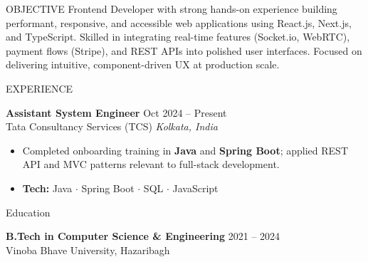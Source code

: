 \documentclass{resume}
\begin{document}
\begin{rSection}{OBJECTIVE}
Frontend Developer with strong hands-on experience building performant,
responsive, and accessible web applications using React.js, Next.js,
and TypeScript. Skilled in integrating real-time features (Socket.io, WebRTC),
payment flows (Stripe), and REST APIs into polished user interfaces.
Focused on delivering intuitive, component-driven UX at production scale.
\end{rSection}


\begin{rSection}{EXPERIENCE}

\textbf{Assistant System Engineer} \hfill Oct 2024 -- Present\\
Tata Consultancy Services (TCS) \hfill \textit{Kolkata, India}
\begin{itemize}
  \itemsep -3pt
  \item Completed onboarding training in \textbf{Java} and \textbf{Spring Boot};
        applied REST API and MVC patterns relevant to full-stack development.
  \item \textbf{Tech:} Java \(\cdot\) Spring Boot \(\cdot\) SQL \(\cdot\) JavaScript
\end{itemize}

\end{rSection}


\begin{rSection}{Education}

{\bf B.Tech in Computer Science \& Engineering} \hfill {2021 -- 2024}\\
Vinoba Bhave University, Hazaribagh

\end{rSection}
\end{document}
